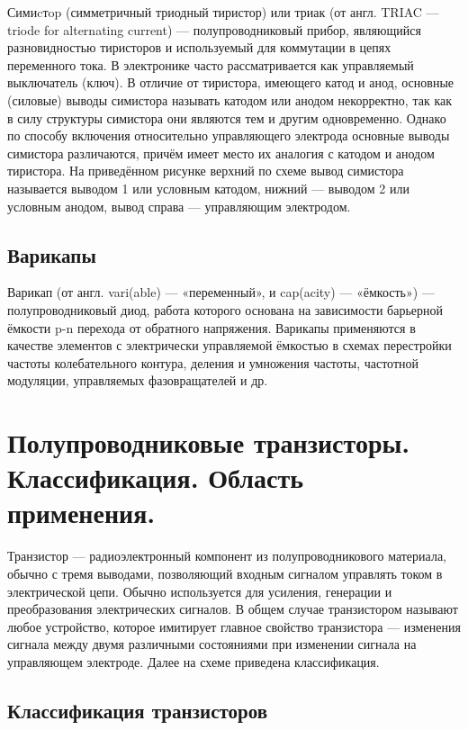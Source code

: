 Симиcтop (симметричный триодный тиристор) или триак (от англ. TRIAC — triode for alternating current) --- полупроводниковый прибор, являющийся разновидностью тиристоров и используемый для коммутации в цепях переменного тока. В электронике часто рассматривается как управляемый выключатель (ключ). В отличие от тиристора, имеющего катод и анод, основные (силовые) выводы симистора называть катодом или анодом некорректно, так как в силу структуры симистора они являются тем и другим одновременно. Однако по способу включения относительно управляющего электрода основные выводы симистора различаются, причём имеет место их аналогия с катодом и анодом тиристора. На приведённом рисунке верхний по схеме вывод симистора называется выводом 1 или условным катодом, нижний --- выводом 2 или условным анодом, вывод справа --- управляющим электродом.

\subsection*{Варикапы}

Варикап (от англ. vari(able) — «переменный», и cap(acity) — «ёмкость») --- полупроводниковый диод, работа которого основана на зависимости барьерной ёмкости p-n перехода от обратного напряжения. Варикапы применяются в качестве элементов с электрически управляемой ёмкостью в схемах перестройки частоты колебательного контура, деления и умножения частоты, частотной модуляции, управляемых фазовращателей и др.


\section{Полупроводниковые транзисторы. Классификация. Область применения.}

Транзистор --- радиоэлектронный компонент из полупроводникового материала, обычно с тремя выводами, позволяющий входным сигналом управлять током в электрической цепи. Обычно используется для усиления, генерации и преобразования электрических сигналов. В общем случае транзистором называют любое устройство, которое имитирует главное свойство транзистора --- изменения сигнала между двумя различными состояниями при изменении сигнала на управляющем электроде. Далее на схеме приведена классификация.

\subsection*{Классификация транзисторов}

